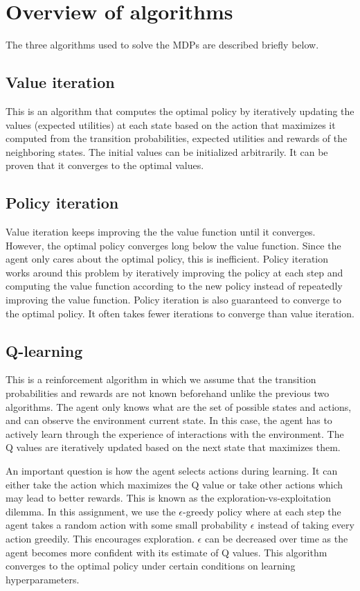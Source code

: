 \documentclass[letterpaper]{article}
\begin{document}
	\section{Overview of algorithms}
	The three algorithms used to solve the MDPs are described briefly below.
	
	\subsection{Value iteration}
	This is an algorithm that computes the optimal policy by iteratively updating the values (expected utilities) at each state based on the action that maximizes it computed from the transition probabilities, expected utilities and rewards of the neighboring states. The initial values can be initialized arbitrarily. It can be proven that it converges to the optimal values.
	
	\subsection{Policy iteration}
	Value iteration keeps improving the the value function until it converges. However, the optimal policy converges long below the value function. Since the agent only cares about the optimal policy, this is inefficient. Policy iteration works around this problem by iteratively improving the policy at each step and computing the value function according to the new policy instead of repeatedly improving the value function. Policy iteration is also guaranteed to converge to the optimal policy. It often takes fewer iterations to converge than value iteration.
	
	\subsection{Q-learning}
	This is a reinforcement algorithm in which we assume that the transition probabilities and rewards are not known beforehand unlike the previous two algorithms. The agent only knows what are the set of possible states and actions, and can observe the environment current state. In this case, the agent has to actively learn through the experience of interactions with the environment. The Q values are iteratively updated based on the next state that maximizes them. 
	
	An important question is how the agent selects actions during learning. It can either take the action which maximizes the Q value or take other actions which may lead to better rewards. This is known as the exploration-vs-exploitation dilemma. In this assignment, we use the $\epsilon$-greedy policy where at each step the agent takes a random action with some small probability $\epsilon$ instead of taking every action greedily. This encourages exploration. $\epsilon$ can be decreased over time as the agent becomes more confident with its estimate of Q values. This algorithm converges to the optimal policy under certain conditions on learning hyperparameters.
	
\end{document}
